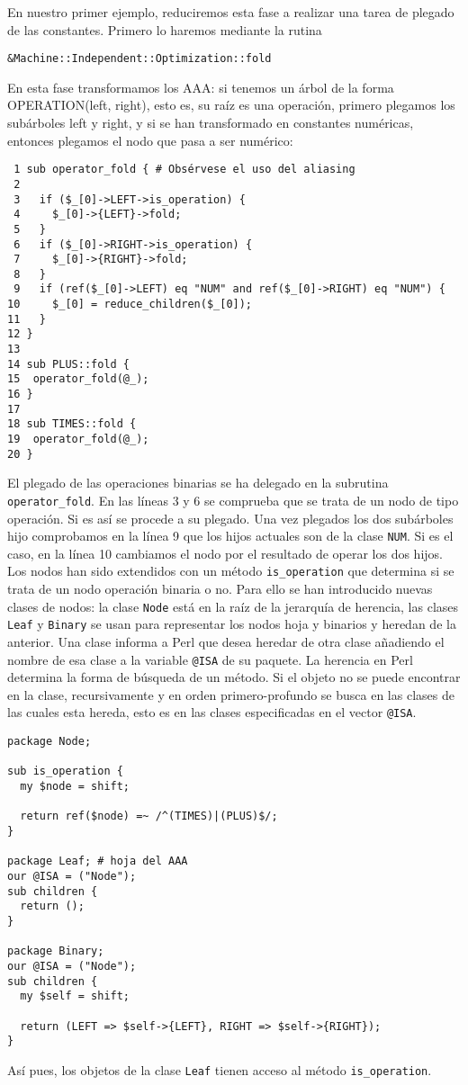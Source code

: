 En nuestro primer ejemplo, reduciremos esta fase a realizar una tarea de plegado
de las constantes. Primero lo haremos mediante la rutina

\begin{center}
\begin{verbatim}
&Machine::Independent::Optimization::fold
\end{verbatim}
\end{center}

En esta fase transformamos los AAA: si tenemos un árbol de la forma 
OPERATION(left, right), esto es, su raíz es una operación,
primero plegamos los subárboles left y right, y si se han
transformado en constantes numéricas, entonces plegamos el nodo
que pasa a ser numérico:

\begin{verbatim}
 1 sub operator_fold { # Obsérvese el uso del aliasing
 2 
 3   if ($_[0]->LEFT->is_operation) {
 4     $_[0]->{LEFT}->fold; 
 5   }
 6   if ($_[0]->RIGHT->is_operation) {
 7     $_[0]->{RIGHT}->fold;
 8   }
 9   if (ref($_[0]->LEFT) eq "NUM" and ref($_[0]->RIGHT) eq "NUM") {
10     $_[0] = reduce_children($_[0]);
11   }
12 }
13 
14 sub PLUS::fold {
15  operator_fold(@_);
16 }
17 
18 sub TIMES::fold {
19  operator_fold(@_);
20 }
\end{verbatim}

El plegado de las operaciones binarias se ha delegado
en la subrutina \verb|operator_fold|. En las líneas 3 y 6 se comprueba
que se trata de un nodo de tipo operación. Si es así se procede
a su plegado. Una vez plegados los dos subárboles hijo comprobamos
en la línea 9 que los hijos actuales son de la clase \verb|NUM|.
Si es el caso, en la línea 10 cambiamos el nodo por el resultado de operar
los dos hijos. Los nodos han sido
extendidos con un método \verb|is_operation| que determina si 
se trata de un nodo operación binaria o no. Para ello 
se han introducido nuevas clases de nodos: la clase \verb|Node|
está en la raíz de la jerarquía de herencia, las clases \verb|Leaf|
y \verb|Binary| se usan para representar los nodos hoja y binarios
y heredan de la anterior.
Una clase informa a Perl que desea heredar de otra clase añadiendo 
el nombre de esa clase a la variable \verb|@ISA| de su paquete.
La herencia en Perl determina la forma de búsqueda de un método. Si el objeto
no se puede encontrar en la clase, recursivamente y en orden primero-profundo
se busca en las clases de las cuales esta hereda, esto es en las clases
especificadas en el vector \verb|@ISA|.

\begin{verbatim}
package Node;

sub is_operation {
  my $node = shift;

  return ref($node) =~ /^(TIMES)|(PLUS)$/;
}

package Leaf; # hoja del AAA
our @ISA = ("Node");
sub children {
  return ();
}

package Binary;
our @ISA = ("Node");
sub children {
  my $self = shift;

  return (LEFT => $self->{LEFT}, RIGHT => $self->{RIGHT});
}
\end{verbatim}
Así pues, los objetos de la clase \verb|Leaf| tienen acceso 
al método \verb|is_operation|.

